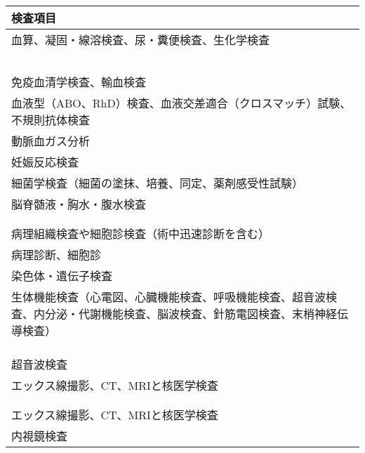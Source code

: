 \documentclass[
]{ltjsarticle}
\begin{document}
\begin{xltabular}{\linewidth}{X}
\caption{\label{tbl:主要な臨床検査}} \\
\toprule
検査項目 \\
\midrule
\endhead
血算、凝固・線溶検査、尿・糞便検査、生化学検査 \\
 \\
 \\
 \\
 \\
 \\
免疫血清学検査、輸血検査 \\
血液型（ABO、RhD）検査、血液交差適合（クロスマッチ）試験、不規則抗体検査 \\
動脈血ガス分析 \\
妊娠反応検査 \\
細菌学検査（細菌の塗抹、培養、同定、薬剤感受性試験） \\
脳脊髄液・胸水・腹水検査 \\
 \\
 \\
病理組織検査や細胞診検査（術中迅速診断を含む） \\
病理診断、細胞診 \\
染色体・遺伝子検査 \\
生体機能検査（心電図、心臓機能検査、呼吸機能検査、超音波検査、内分泌・代謝機能検査、脳波検査、針筋電図検査、末梢神経伝導検査） \\
 \\
 \\
 \\
超音波検査 \\
エックス線撮影、CT、MRIと核医学検査 \\
 \\
 \\
エックス線撮影、CT、MRIと核医学検査 \\
内視鏡検査 \\
\bottomrule
\end{xltabular}
\end{document}

